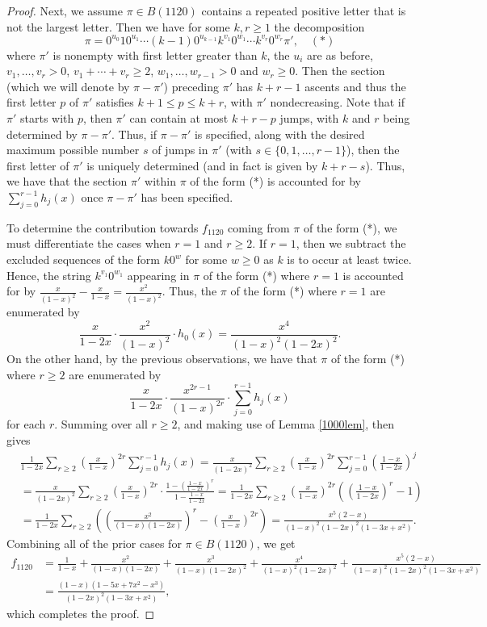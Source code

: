 \documentclass{article}
\theoremstyle{remark}
\theoremstyle{plain}
\begin{document}
\begin{proof}
Next, we assume $\pi \in B(1120)$ contains a repeated positive letter that is not the largest letter.  Then we have for some $k, r \geq 1$ the decomposition
$$\pi=0^{u_0}10^{u_1}\cdots(k-1)0^{u_{k-1}}k^{v_1}0^{w_1}\cdots k^{v_r}0^{w_r}\pi', \quad (*)$$
where $\pi'$ is nonempty with first letter greater than $k$, the $u_i$ are as before, $v_1,\ldots,v_r>0$, $v_1+\cdots+v_r\geq 2$, $w_1,\ldots,w_{r-1}>0$ and $w_r \geq0$.  Then the section (which we will denote by $\pi-\pi'$) preceding $\pi'$ has $k+r-1$ ascents and thus the first letter $p$ of $\pi'$ satisfies $k+1 \leq p \leq k+r$, with $\pi'$ nondecreasing.  Note that if $\pi'$ starts with $p$, then $\pi'$ can contain at most $k+r-p$ jumps, with $k$ and $r$ being determined by $\pi-\pi'$.  Thus, if $\pi-\pi'$ is specified, along with the desired maximum possible number $s$ of jumps in $\pi'$ (with $s \in \{0,1,\ldots,r-1\}$), then the first letter of $\pi'$ is uniquely determined (and in fact is given by $k+r-s$).  Thus, we have that the section $\pi'$ within $\pi$ of the form (*) is accounted for by $\sum_{j=0}^{r-1}h_j(x)$ once $\pi-\pi'$ has been specified.

To determine the contribution towards $f_{1120}$ coming from $\pi$ of the form (*), we must differentiate the cases when $r=1$ and $r \geq 2$.  If $r=1$, then we subtract the excluded sequences of the form $k0^w$ for some $w \geq0$ as $k$ is to occur at least twice.  Hence, the string $k^{v_1}0^{w_1}$ appearing in $\pi$ of the form (*) where $r=1$ is accounted for by $\frac{x}{(1-x)^2}-\frac{x}{1-x}=\frac{x^2}{(1-x)^2}$.  Thus, the $\pi$ of the form (*) where $r=1$ are enumerated by
$$\frac{x}{1-2x}\cdot\frac{x^2}{(1-x)^2}\cdot h_0(x)=\frac{x^4}{(1-x)^2(1-2x)^2}.$$
On the other hand, by the previous observations, we have that $\pi$ of the form (*) where $r \geq 2$ are enumerated by
$$\frac{x}{1-2x}\cdot \frac{x^{2r-1}}{(1-x)^{2r}}\cdot\sum_{j=0}^{r-1}h_j(x)$$
for each $r$.  Summing over all $r \geq 2$, and making use of Lemma \ref{1000lem}, then gives
\begin{align*}
&\frac{1}{1-2x}\sum_{r\geq2}\left(\frac{x}{1-x}\right)^{2r}\sum_{j=0}^{r-1}h_j(x)=\frac{x}{(1-2x)^2}\sum_{r\geq2}\left(\frac{x}{1-x}\right)^{2r}\sum_{j=0}^{r-1}\left(\frac{1-x}{1-2x}\right)^j\\
&=\frac{x}{(1-2x)^2}\sum_{r\geq2}\left(\frac{x}{1-x}\right)^{2r}\cdot\frac{1-\left(\frac{1-x}{1-2x}\right)^r}{1-\frac{1-x}{1-2x}}=\frac{1}{1-2x}\sum_{r\geq2}\left(\frac{x}{1-x}\right)^{2r}\left(\left(\frac{1-x}{1-2x}\right)^r-1\right)\\
&=\frac{1}{1-2x}\sum_{r\geq2}\left(\left(\frac{x^2}{(1-x)(1-2x)}\right)^r-\left(\frac{x}{1-x}\right)^{2r}\right)=\frac{x^5(2-x)}{(1-x)^2(1-2x)^2(1-3x+x^2)}.
\end{align*}
Combining all of the prior cases for $\pi \in B(1120)$, we get
\begin{align*}
f_{1120}&=\frac{1}{1-x}+\frac{x^2}{(1-x)(1-2x)}+\frac{x^3}{(1-x)(1-2x)^2}+\frac{x^4}{(1-x)^2(1-2x)^2}+\frac{x^5(2-x)}{(1-x)^2(1-2x)^2(1-3x+x^2)}\\
&=\frac{(1-x)(1-5x+7x^2-x^3)}{(1-2x)^2(1-3x+x^2)},
\end{align*}
which completes the proof.
\end{proof}
\end{document}
